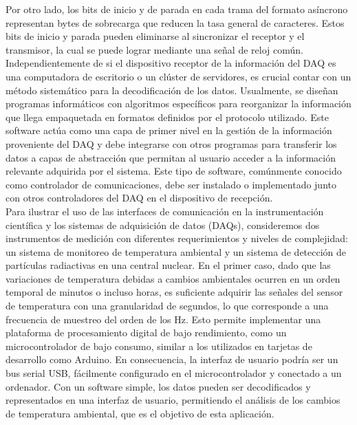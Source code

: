 \documentclass[]{book}
\begin{document}
\noindent Por otro lado, los bits de inicio y de parada en cada trama del formato asíncrono representan bytes de sobrecarga que reducen la tasa general de caracteres. Estos bits de inicio y parada pueden eliminarse al sincronizar el receptor y el transmisor, la cual se puede lograr mediante una señal de reloj común.\\

\noindent Independientemente de si el dispositivo receptor de la información del DAQ es una computadora de escritorio o un clúster de servidores, es crucial contar con un método sistemático para la decodificación de los datos. Usualmente, se diseñan programas informáticos con algoritmos específicos para reorganizar la información que llega empaquetada en formatos definidos por el protocolo utilizado. Este software actúa como una capa de primer nivel en la gestión de la información proveniente del DAQ y debe integrarse con otros programas para transferir los datos a capas de abstracción que permitan al usuario acceder a la información relevante adquirida por el sistema. Este tipo de software, comúnmente conocido como controlador de comunicaciones, debe ser instalado o implementado junto con otros controladores del DAQ en el dispositivo de recepción.\\

\noindent Para ilustrar el uso de las interfaces de comunicación en la instrumentación científica y los sistemas de adquisición de datos (DAQs), consideremos dos instrumentos de medición con diferentes requerimientos y niveles de complejidad: un sistema de monitoreo de temperatura ambiental y un sistema de detección de partículas radiactivas en una central nuclear. En el primer caso, dado que las variaciones de temperatura debidas a cambios ambientales ocurren en un orden temporal de minutos o incluso horas, es suficiente adquirir las señales del sensor de temperatura con una granularidad de segundos, lo que corresponde a una frecuencia de muestreo del orden de los Hz. Esto permite implementar una plataforma de procesamiento digital de bajo rendimiento, como un microcontrolador de bajo consumo, similar a los utilizados en tarjetas de desarrollo como Arduino. En consecuencia, la interfaz de usuario podría ser un bus serial USB, fácilmente configurado en el microcontrolador y conectado a un ordenador. Con un software simple, los datos pueden ser decodificados y representados en una interfaz de usuario, permitiendo el análisis de los cambios de temperatura ambiental, que es el objetivo de esta aplicación. \\
\end{document}
